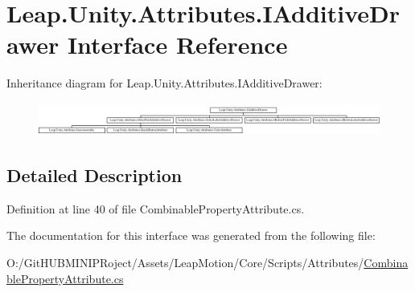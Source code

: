 \hypertarget{interface_leap_1_1_unity_1_1_attributes_1_1_i_additive_drawer}{}\section{Leap.\+Unity.\+Attributes.\+I\+Additive\+Drawer Interface Reference}
\label{interface_leap_1_1_unity_1_1_attributes_1_1_i_additive_drawer}
Inheritance diagram for Leap.\+Unity.\+Attributes.\+I\+Additive\+Drawer\+:\begin{figure}[H]
\begin{center}
\leavevmode
\includegraphics[height=1.116279cm]{interface_leap_1_1_unity_1_1_attributes_1_1_i_additive_drawer}
\end{center}
\end{figure}


\subsection{Detailed Description}


Definition at line 40 of file Combinable\+Property\+Attribute.\+cs.



The documentation for this interface was generated from the following file\+:\begin{DoxyCompactItemize}
\item 
O\+:/\+Git\+H\+U\+B\+M\+I\+N\+I\+P\+Roject/\+Assets/\+Leap\+Motion/\+Core/\+Scripts/\+Attributes/\mbox{\hyperlink{_combinable_property_attribute_8cs}{Combinable\+Property\+Attribute.\+cs}}\end{DoxyCompactItemize}
